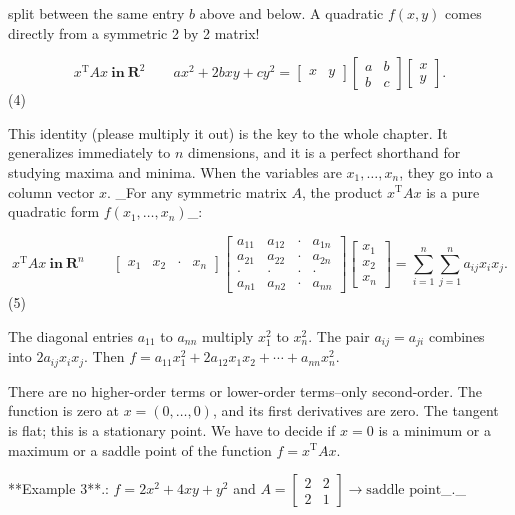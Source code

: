 split between the same entry \(b\) above and below. A quadratic \(f(x,y)\) comes directly from a symmetric 2 by 2 matrix!

\[x^{\mathrm{T}}Ax\ \mathbf{in}\ \mathbf{R}^{2}\qquad ax^{2}+2bxy+cy^{2}=\begin{bmatrix}x &y\end{bmatrix}\begin{bmatrix}a&b\\ b&c\end{bmatrix}\begin{bmatrix}x\\ y\end{bmatrix}.\] (4)

This identity (please multiply it out) is the key to the whole chapter. It generalizes immediately to \(n\) dimensions, and it is a perfect shorthand for studying maxima and minima. When the variables are \(x_{1},\ldots,x_{n}\), they go into a column vector \(x\). _For any symmetric matrix \(A\), the product \(x^{\mathrm{T}}Ax\) is a pure quadratic form \(f(x_{1},\ldots,x_{n})\)_:

\[x^{\mathrm{T}}Ax\ \mathbf{in}\ \mathbf{R}^{n}\qquad\begin{bmatrix}x_{1}&x_{2} &\cdot&x_{n}\end{bmatrix}\begin{bmatrix}a_{11}&a_{12}&\cdot&a_{1n}\\ a_{21}&a_{22}&\cdot&a_{2n}\\ \cdot&\cdot&\cdot&\cdot\\ a_{n1}&a_{n2}&\cdot&a_{nn}\end{bmatrix}\begin{bmatrix}x_{1}\\ x_{2}\\ x_{n}\end{bmatrix}=\sum_{i=1}^{n}\sum_{j=1}^{n}a_{ij}x_{i}x_{j}.\] (5)

The diagonal entries \(a_{11}\) to \(a_{nn}\) multiply \(x_{1}^{2}\) to \(x_{n}^{2}\). The pair \(a_{ij}=a_{ji}\) combines into \(2a_{ij}x_{i}x_{j}\). Then \(f=a_{11}x_{1}^{2}+2a_{12}x_{1}x_{2}+\cdots+a_{nn}x_{n}^{2}\).

There are no higher-order terms or lower-order terms--only second-order. The function is zero at \(x=(0,\ldots,0)\), and its first derivatives are zero. The tangent is flat; this is a stationary point. We have to decide if \(x=0\) is a minimum or a maximum or a saddle point of the function \(f=x^{\mathrm{T}}Ax\).

**Example 3**.: \(f=2x^{2}+4xy+y^{2}\) and \(A=\begin{bmatrix}2&2\\ 2&1\end{bmatrix}\to\text{saddle point}\)_._

